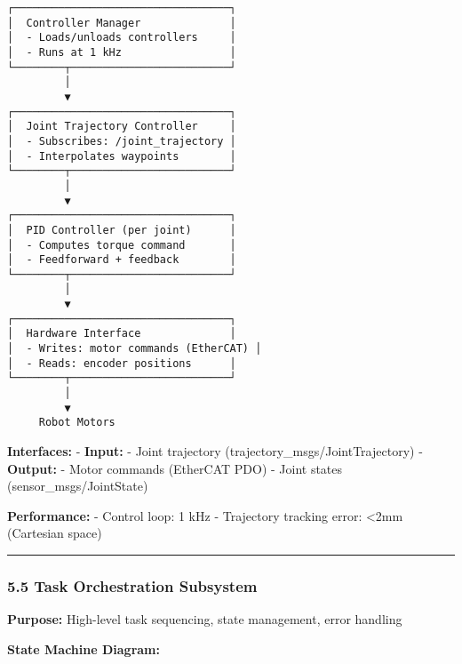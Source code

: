 \documentclass[
]{article}
\begin{document}
\begin{verbatim}
┌──────────────────────────────────┐
│  Controller Manager              │
│  - Loads/unloads controllers     │
│  - Runs at 1 kHz                 │
└────────┬─────────────────────────┘
         │
         ▼
┌──────────────────────────────────┐
│  Joint Trajectory Controller     │
│  - Subscribes: /joint_trajectory │
│  - Interpolates waypoints        │
└────────┬─────────────────────────┘
         │
         ▼
┌──────────────────────────────────┐
│  PID Controller (per joint)      │
│  - Computes torque command       │
│  - Feedforward + feedback        │
└────────┬─────────────────────────┘
         │
         ▼
┌──────────────────────────────────┐
│  Hardware Interface              │
│  - Writes: motor commands (EtherCAT) │
│  - Reads: encoder positions      │
└────────┬─────────────────────────┘
         │
         ▼
     Robot Motors
\end{verbatim}

\textbf{Interfaces:} - \textbf{Input:} - Joint trajectory
(trajectory\_msgs/JointTrajectory) - \textbf{Output:} - Motor commands
(EtherCAT PDO) - Joint states (sensor\_msgs/JointState)

\textbf{Performance:} - Control loop: 1 kHz - Trajectory tracking error:
\textless2mm (Cartesian space)

\begin{center}\rule{0.5\linewidth}{0.5pt}\end{center}

\hypertarget{task-orchestration-subsystem}{%
\subsubsection{5.5 Task Orchestration
Subsystem}\label{task-orchestration-subsystem}}

\textbf{Purpose:} High-level task sequencing, state management, error
handling

\textbf{State Machine Diagram:}
\end{document}
